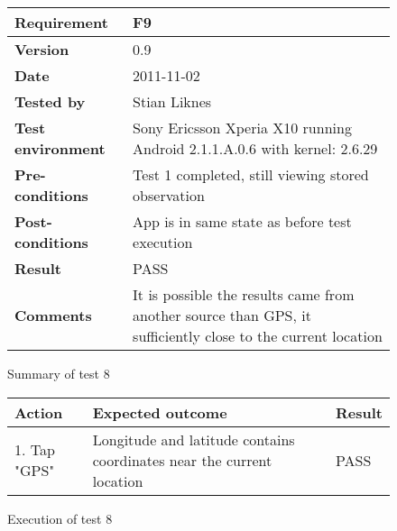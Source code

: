 	\begin{figure}[htb]
		\centering
		\begin{tabular}{|p{3.5cm}|p{7.0cm}|} \hline
			\textbf{Requirement} & F9 \\ \hline
			\textbf{Version} & 0.9 \\ \hline
			\textbf{Date} & 2011-11-02 \\ \hline
			\textbf{Tested by} & Stian Liknes \\ \hline
			\textbf{Test environment} & Sony Ericsson Xperia X10 running Android 2.1.1.A.0.6 with kernel: 2.6.29 \\ \hline
			\textbf{Pre-conditions} & Test 1 completed, still viewing stored observation \\ \hline
			\textbf{Post-conditions} & App is in same state as before test execution \\ \hline
			\textbf{Result} & PASS \\ \hline
			\textbf{Comments} & It is possible the results came from another
			source than GPS, it sufficiently close to the current location \\
			\hline
		\end{tabular}
		\caption{Summary of test 8}
	\end{figure}

	\begin{figure}[htb]
		\centering
		\begin{tabular}{|p{5.0cm}|p{5.0cm}|p{1cm}|}
			\hline \textbf{Action} & \textbf{Expected outcome} & \textbf{Result} \\ \hline
			
			1. Tap "GPS" &
			Longitude and latitude contains coordinates near the current location &
			PASS \\ \hline

		\end{tabular}
		\caption{Execution of test 8}
	\end{figure}

\newpage
